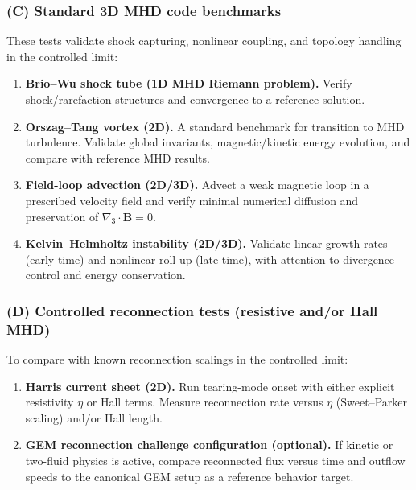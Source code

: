 \documentclass[11pt]{article}
\newcommand{\gradthree}{\nabla_3}
\newcommand{\B}{\mathbf{B}}
\begin{document}
\subsubsection*{(C) Standard 3D MHD code benchmarks}
These tests validate shock capturing, nonlinear coupling, and topology handling in
the controlled limit:
\begin{enumerate}[leftmargin=1.6em]
\item \textbf{Brio--Wu shock tube (1D MHD Riemann problem).}
Verify shock/rarefaction structures and convergence to a reference solution.

\item \textbf{Orszag--Tang vortex (2D).}
A standard benchmark for transition to MHD turbulence. Validate global invariants,
magnetic/kinetic energy evolution, and compare with reference MHD results.

\item \textbf{Field-loop advection (2D/3D).}
Advect a weak magnetic loop in a prescribed velocity field and verify minimal
numerical diffusion and preservation of \(\gradthree\cdot\B=0\).

\item \textbf{Kelvin--Helmholtz instability (2D/3D).}
Validate linear growth rates (early time) and nonlinear roll-up (late time), with
attention to divergence control and energy conservation.
\end{enumerate}

\subsubsection*{(D) Controlled reconnection tests (resistive and/or Hall MHD)}
To compare with known reconnection scalings in the controlled limit:
\begin{enumerate}[leftmargin=1.6em]
\item \textbf{Harris current sheet (2D).}
Run tearing-mode onset with either explicit resistivity \(\eta\) or Hall terms.
Measure reconnection rate versus \(\eta\) (Sweet--Parker scaling) and/or Hall length.

\item \textbf{GEM reconnection challenge configuration (optional).}
If kinetic or two-fluid physics is active, compare reconnected flux versus time and
outflow speeds to the canonical GEM setup as a reference behavior target.
\end{enumerate}
\end{document}
